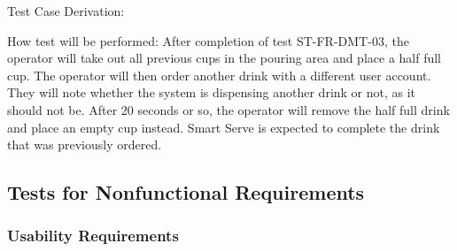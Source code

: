 \documentclass[12pt, titlepage]{article}
\begin{document}
\begin{enumerate}
Test Case Derivation: 

How test will be performed: After completion of test ST-FR-DMT-03, the operator will take out all previous cups in the pouring area and place a half full cup. The operator will then order another drink with a different user account. They will note whether the system is dispensing another drink or not, as it should not be. After 20 seconds or so, the operator will remove the half full drink and place an empty cup instead. Smart Serve is expected to complete the drink that was previously ordered.

\end{enumerate}

\subsection{Tests for Nonfunctional Requirements}



\subsubsection{Usability Requirements}
\end{document}
